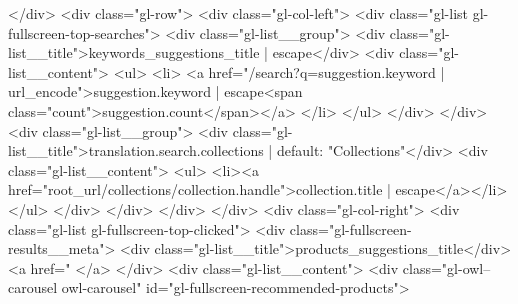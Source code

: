 {{{{{{{{{{{{{{{{{{{{{{{{{{{{{{{{{        </div>
        {%
          <div class="gl-row">
            {%
            <div class="gl-col-left">
              <div class="gl-list gl-fullscreen-top-searches">
                                {%
                <div class="gl-list__group">
                  <div class="gl-list__title">{{keywords_suggestions_title | escape}}</div>
                  <div class="gl-list__content">
                    <ul>
                      {%
                      <li>
                        <a href="/search?q={{suggestion.keyword | url_encode}}">{{suggestion.keyword | escape}}<span class="count">{{suggestion.count}}</span></a>
                      </li>
                      {%
                    </ul>
                  </div>
                </div>
                {%
                                                {%
                <div class="gl-list__group">
                  <div class="gl-list__title">{{translation.search.collections | default: "Collections"}}</div>
                  <div class="gl-list__content">
                    <ul>
                      {%
                      <li><a href="{{root_url}}/collections/{{collection.handle}}">{{collection.title | escape}}</a></li>
                      {%
                    </ul>
                  </div>
                </div>
                {%
                              </div>
            </div>
            {%
            <div class="gl-col-right">
                            {%
              <div class="gl-list gl-fullscreen-top-clicked">
                <div class="gl-fullscreen-results__meta">
                  <div class="gl-list__title">{{products_suggestions_title}}</div>
                  {%
                    <a href="{%
                      {%
                    </a>
                  {%
                </div>
                <div class="gl-list__content">
                  {%
                  <div class="gl-owl--carousel owl-carousel" id="gl-fullscreen-recommended-products">
                    {%
}}}}}}}}}}}}}}}}}}}}}}}}}}}}}}}}}}}}}}}}}}}}}}}}}}}
